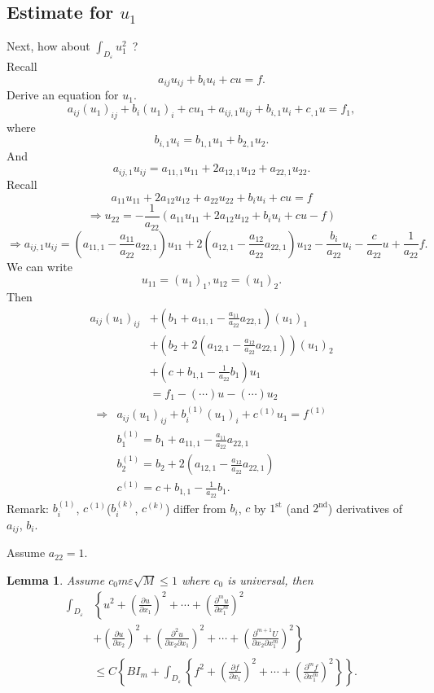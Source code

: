 \documentclass[12pt]{article}
\newtheorem{lemma}{Lemma}
\begin{document}
\subsection{Estimate for $u_1$}
Next, how about $ \int_{D_\varepsilon}u_1^2 $\ ?\\
Recall
\[ a_{ij}u_{ij}+b_iu_i + cu = f. \]
Derive an equation for $ u_1 $.
\[ a_{ij}(u_1)_{ij} + b_i(u_1)_i + cu_1 + a_{ij, 1}u_{ij}+b_{i, 1}u_i+c_{, 1}u = f_1, \]
where
\[ b_{i, 1}u_i = b_{1, 1}u_1 + b_{2, 1}u_2. \]
And
\[ a_{ij, 1}u_{ij} = a_{11, 1}u_{11} + 2a_{12, 1}u_{12}+a_{22, 1}u_{22}. \]
Recall
\[ a_{11}u_{11}+2a_{12}u_{12}+a_{22}u_{22}+b_iu_i+cu = f \]
\[ \Rightarrow u_{22} = -\frac{1}{a_{22}} (a_{11}u_{11} + 2a_{12}u_{12} + b_iu_i+cu-f) \]
\[ \Rightarrow a_{ij, 1}u_{ij} = \left( a_{11, 1} - \frac{a_{11}}{a_{22}}a_{22, 1} \right)u_{11} + 2\left( a_{12, 1} - \frac{a_{12}}{a_{22}}a_{22, 1} \right)u_{12} - \frac{b_i}{a_{22}}u_i - \frac{c}{a_{22}}u+\frac{1}{a_{22}}f. \]
We can write
\[ u_{11}=(u_1)_1, u_{12}=(u_1)_2. \]
Then
\begin{align*}
a_{ij}(u_1)_{ij} &+\left(b_1+a_{11, 1}-\frac{a_{11}}{a_{22}} a_{22, 1} \right)(u_1)_1\\
 &+\left( b_2+2\left( a_{12, 1} - \frac{a_{12}}{a_{22}}a_{22, 1} \right) \right) (u_1)_2\\
 &+\left( c+b_{1, 1} - \frac{1}{a_{22}}b_1 \right)u_1\\
&= f_1 - (\cdots)u-(\cdots)u_2
\end{align*}
\begin{align*}
\Rightarrow &a_{ij}(u_1)_{ij} + b_i^{(1)}(u_1)_i + c^{(1)}u_1 = f^{(1)}\\
&b^{(1)}_1 = b_1+a_{11, 1}-\frac{a_{11}}{a_{22}} a_{22, 1}\\
&b^{(1)}_2 = b_2+2\left( a_{12, 1} - \frac{a_{12}}{a_{22}}a_{22, 1} \right)\\
&c^{(1)} = c+b_{1, 1} - \frac{1}{a_{22}}b_1.
\end{align*}
Remark: $ b^{(1)}_i $, $ c^{(1)} $($ b^{(k)}_i $, $ c^{(k)} $) differ from $ b_i $, $ c $ by $\mathrm{1^{st}}$ (and $\mathrm{2^{nd}}$) derivatives of $ a_{ij} $, $ b_i $.

Assume $ a_{22} = 1 $.
\begin{lemma}
Assume $ c_0m\varepsilon\sqrt{M}\le1 $ where $c_0$ is universal, then
\begin{align*}
\int_{D_\varepsilon} &\left\{ u^2 + \left(\frac{\partial{u}}{\partial x_1} \right)^2 + \cdots + \left( \frac{\partial^{m}u}{\partial x_1^m} \right)^2 \right. \\
&\left. +\left( \frac{\partial u}{\partial x_2} \right)^2 + \left( \frac{\partial^2 u}{\partial x_2 \partial x_1} \right)^2 + \cdots + \left( \frac{\partial^{m + 1}U}{\partial x_2\partial x_1^{m}} \right)^2 \right\}\\
&\le C\left\{ BI_m + \int_{D_\varepsilon} \left\{ f^2 + \left( \frac{\partial f}{\partial x_1} \right)^2 + \cdots + \left( \frac{\partial^m f}{\partial x_1^m} \right)^2 \right\} \right\}.
\end{align*}
\end{lemma}
\end{document}
